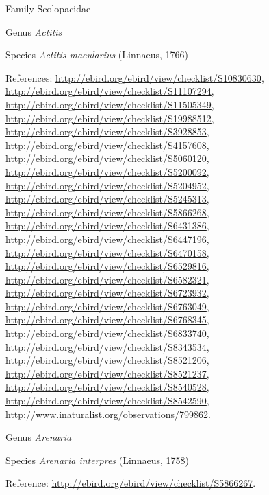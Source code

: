 \documentclass[9pt, article]{memoir}
\begin{document}
\begin{multicols}{2}
\vspace{6pt}\noindent\hspace{24pt}Family Scolopacidae


\vspace{6pt}\noindent\hspace{30pt}Genus \textit{Actitis}


\vspace{6pt}\noindent\hspace{36pt}Species \textit{Actitis macularius} (Linnaeus, 1766)


\vspace{6pt}References: 
\url{http://ebird.org/ebird/view/checklist/S10830630}, 
\url{http://ebird.org/ebird/view/checklist/S11107294}, 
\url{http://ebird.org/ebird/view/checklist/S11505349}, 
\url{http://ebird.org/ebird/view/checklist/S19988512}, 
\url{http://ebird.org/ebird/view/checklist/S3928853}, 
\url{http://ebird.org/ebird/view/checklist/S4157608}, 
\url{http://ebird.org/ebird/view/checklist/S5060120}, 
\url{http://ebird.org/ebird/view/checklist/S5200092}, 
\url{http://ebird.org/ebird/view/checklist/S5204952}, 
\url{http://ebird.org/ebird/view/checklist/S5245313}, 
\url{http://ebird.org/ebird/view/checklist/S5866268}, 
\url{http://ebird.org/ebird/view/checklist/S6431386}, 
\url{http://ebird.org/ebird/view/checklist/S6447196}, 
\url{http://ebird.org/ebird/view/checklist/S6470158}, 
\url{http://ebird.org/ebird/view/checklist/S6529816}, 
\url{http://ebird.org/ebird/view/checklist/S6582321}, 
\url{http://ebird.org/ebird/view/checklist/S6723932}, 
\url{http://ebird.org/ebird/view/checklist/S6763049}, 
\url{http://ebird.org/ebird/view/checklist/S6768345}, 
\url{http://ebird.org/ebird/view/checklist/S6833740}, 
\url{http://ebird.org/ebird/view/checklist/S8343534}, 
\url{http://ebird.org/ebird/view/checklist/S8521206}, 
\url{http://ebird.org/ebird/view/checklist/S8521237}, 
\url{http://ebird.org/ebird/view/checklist/S8540528}, 
\url{http://ebird.org/ebird/view/checklist/S8542590}, 
\url{http://www.inaturalist.org/observations/799862}.

\vspace{6pt}\noindent\hspace{30pt}Genus \textit{Arenaria}


\vspace{6pt}\noindent\hspace{36pt}Species \textit{Arenaria interpres} (Linnaeus, 1758)


\vspace{6pt}Reference: 
\url{http://ebird.org/ebird/view/checklist/S5866267}.


\end{multicols}
\end{document}
